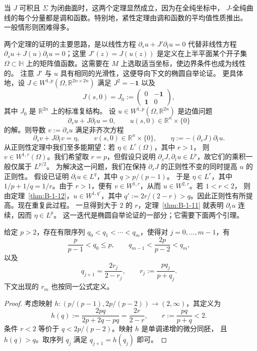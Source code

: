 当 $J$ 可积且 $\Sigma$ 为闭曲面时，这两个定理显然成立，因为在全纯坐标中，
$J$-全纯曲线的每个分量都是调和函数。特别地，紧性定理由调和函数的平均值性质推出。
一般情形则困难得多。

两个定理的证明的主要思路，是以线性方程 $\partial_su+J'\partial_tu=0$
代替非线性方程 $\partial_su+J(u)\partial_tu=0$；这里
$J'(z)=J(u(z))$ 是定义在上半平面某个开子集 $\Omega\subset\mathbb H$
上的矩阵值函数。这需要在 $M$ 上选取适当坐标，使边界条件也成为线性的。
注意 $J'$ 与 $u$ 具有相同的光滑性，这便导向下文的椭圆自举论证。
更具体地，设 $J\in W^{1,p}(\Omega,\mathbb R^{2n\times2n})$ 满足
$J^2=-\mathbf 1$ 以及
\begin{equation}\label{eq:B-4-1}
  J(s,0)=J_0:=\begin{pmatrix}0&-\mathbf 1\\ \mathbf 1&0\end{pmatrix},
\end{equation}
其中 $J_0$ 是 $\mathbb R^{2n}$ 上的标准复结构。
设 $u\in W^{1,p}(\Omega,\mathbb R^{2n})$ 是边值问题
\[
  \partial_su+J\partial_tu=0,\qquad u(s,0)\in\mathbb R^n\times\{0\}
\]
的解。则导数 $v:=\partial_su$ 满足非齐次方程
\[
  \partial_sv+J\partial_tv=\eta,\qquad
  v(s,0)\in\mathbb R^n\times\{0\},\qquad
  \eta:=-(\partial_sJ)\partial_tu.
\]
从正则性定理中我们至多能期望：若 $\eta\in L^r(\Omega)$，其中 $r>1$，
则 $v\in W^{1,r}(\Omega)$。我们希望取 $r=p$，但假设只说明
$\partial_sJ,\partial_tu\in L^p$，故它们的乘积一般仅属于 $L^{p/2}$。
为解决这一问题，我们在保持 $\partial_sJ$ 的正则性不变的同时提高 $u$ 的正则性。
假设已证明 $\partial_tu\in L^q$，其中 $q>p/(p-1)$。
于是 $\eta\in L^r$，其中 $1/p+1/q=1/r$。由于 $r>1$，便有
$v\in W^{1,r}$，从而 $u\in W^{2,r}$。若 $1<r<2$，
则由定理~\ref{thm:B-1-12}，$u\in W^{1,q'}$，其中
$q':=2r/(2-r)>q$。因此正则性有所提高。现在重复此过程。
一旦得到大于 $2$ 的 $r$，定理~\ref{thm:B-1-11} 就表明
$\partial_tu$ 连续，因而 $\eta\in L^p$。
这一迭代是椭圆自举论证的一部分；它需要下面两个引理。

\begin{lemma}\label{lem:B-4-4}
给定 $p>2$，存在有限序列 $q_0<q_1<\cdots<q_m$，使得对
$j=0,\ldots,m-1$，有
\[
  \frac p{p-1}<q_0\le p,\qquad
  q_{m-1}<\frac{2p}{p-2}<q_m,
\]
以及
\[
  q_{j+1}=\frac{2r_j}{2-r_j},\qquad r_j:=\frac{pq_j}{p+q_j}.
\]
下文出现的 $r_m$ 也按同一公式定义。
\end{lemma}
\begin{proof}
考虑映射 $h:(p/(p-1),2p/(p-2))\to(2,\infty)$，其定义为
\[
  h(q):=\frac{2pq}{2p+2q-pq}=\frac{2r}{2-r},\qquad
  r:=\frac{pq}{p+q}<2.
\]
条件 $r<2$ 等价于 $q<2p/(p-2)$。映射 $h$ 是单调递增的微分同胚，
且 $h(q)>q$。取序列 $q_j$ 满足 $q_{j+1}=h(q_j)$ 即可。
\end{proof}

